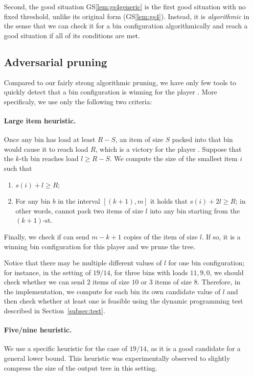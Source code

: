 Second, the good situation GS\ref{lem:gs4generic} is the first good
situation with no fixed threshold, unlike its original form
(GS\ref{lem:gs4}). Instead, it is \emph{algorithmic} in the sense that
we can check it for a bin configuration algorithmically and reach a
good situation if all of its conditions are met.

\subsection{Adversarial pruning}\label{sec:4:advpruning}

Compared to our fairly strong algorithmic pruning, we have only few
tools to quickly detect that a bin configuration is winning for the
player \adversary. More specificaly, we use only the following two
criteria:

\paragraph{Large item heuristic.} Once any bin has load at least $R-S$,
an item of size $S$ packed into that bin would cause it to reach load
$R$, which is a victory for the player \adversary. Suppose that the
$k$-th bin reaches load $l \ge R-S$. We compute the size of the
smallest item $i$ such that

\begin{enumerate}
\item $s(i) + l \ge R$;
\item For any bin $b$ in the interval $[(k+1), m]$ it holds
that $s(i) + 2l \ge R$; in other words, \algo cannot pack
two items of size $l$ into any bin starting from the $(k+1)$-st.
\end{enumerate}

Finally, we check if \adversary can send $m-k+1$ copies of the item of
size $l$. If so, it is a winning bin configuration for this player and
we prune the tree.

Notice that there may be multiple different values of $l$ for one bin
configuration; for instance, in the setting of $19/14$, for three bins
with loads $11,9,0$, we should check whether we can send $2$ items of
size $10$ or $3$ items of size $8$. Therefore, in the implementation,
we compute for each bin its own candidate value of $l$ and then check
whether at least one is feasible using the dynamic programming test
described in Section~\ref{subsec:test}.

\paragraph{Five/nine heuristic.} We use a specific heuristic for the
case of $19/14$, as it is a good candidate for a general lower
bound. This heuristic was experimentally observed to slightly compress
the size of the output tree in this setting.

